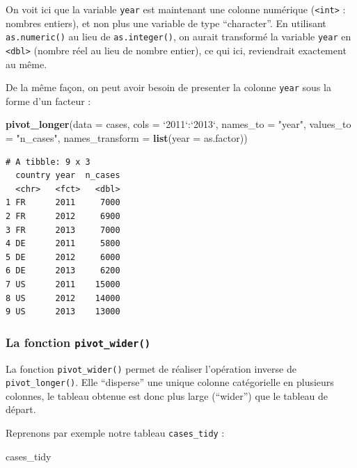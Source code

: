 \documentclass[
  a4paper,
]{article}
\newenvironment{Shaded}{\begin{snugshade}}{\end{snugshade}}
\newcommand{\DataTypeTok}[1]{\textcolor[rgb]{0.00,0.34,0.68}{#1}}
\newcommand{\KeywordTok}[1]{\textcolor[rgb]{0.12,0.11,0.11}{\textbf{#1}}}
\newcommand{\NormalTok}[1]{\textcolor[rgb]{0.12,0.11,0.11}{#1}}
\newcommand{\OperatorTok}[1]{\textcolor[rgb]{0.12,0.11,0.11}{#1}}
\newcommand{\StringTok}[1]{\textcolor[rgb]{0.75,0.01,0.01}{#1}}
\begin{document}
On voit ici que la variable \texttt{year} est maintenant une colonne numérique (\texttt{\textless{}int\textgreater{}} : nombres entiers), et non plus une variable de type ``character''. En utilisant \texttt{as.numeric()} au lieu de \texttt{as.integer()}, on aurait transformé la variable \texttt{year} en \texttt{\textless{}dbl\textgreater{}} (nombre réel au lieu de nombre entier), ce qui ici, reviendrait exactement au même.

De la même façon, on peut avoir besoin de presenter la colonne \texttt{year} sous la forme d'un facteur :

\begin{Shaded}
\begin{Highlighting}[]
\KeywordTok{pivot_longer}\NormalTok{(}\DataTypeTok{data =}\NormalTok{ cases, }
             \DataTypeTok{cols =} \StringTok{`}\DataTypeTok{2011}\StringTok{`}\OperatorTok{:}\StringTok{`}\DataTypeTok{2013}\StringTok{`}\NormalTok{, }
             \DataTypeTok{names_to =} \StringTok{"year"}\NormalTok{, }
             \DataTypeTok{values_to =} \StringTok{"n_cases"}\NormalTok{,}
             \DataTypeTok{names_transform =} \KeywordTok{list}\NormalTok{(}\DataTypeTok{year =}\NormalTok{ as.factor))}
\end{Highlighting}
\end{Shaded}

\begin{verbatim}
# A tibble: 9 x 3
  country year  n_cases
  <chr>   <fct>   <dbl>
1 FR      2011     7000
2 FR      2012     6900
3 FR      2013     7000
4 DE      2011     5800
5 DE      2012     6000
6 DE      2013     6200
7 US      2011    15000
8 US      2012    14000
9 US      2013    13000
\end{verbatim}

\hypertarget{spread}{%
\subsubsection{\texorpdfstring{La fonction \texttt{pivot\_wider()}}{La fonction pivot\_wider()}}\label{spread}}

La fonction \texttt{pivot\_wider()} permet de réaliser l'opération inverse de \texttt{pivot\_longer()}. Elle ``disperse'' une unique colonne catégorielle en plusieurs colonnes, le tableau obtenue est donc plus large (``wider'') que le tableau de départ.

Reprenons par exemple notre tableau \texttt{cases\_tidy} :

\begin{Shaded}
\begin{Highlighting}[]
\NormalTok{cases_tidy}
\end{Highlighting}
\end{Shaded}
\end{document}
